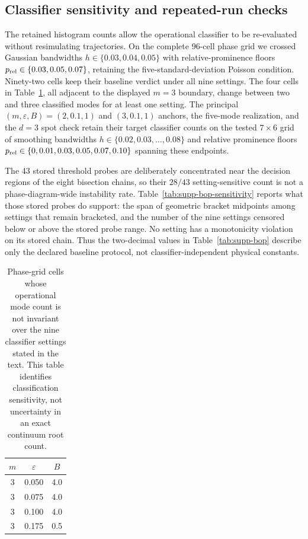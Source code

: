 \documentclass[aps,physrev,onecolumn,amsmath,amssymb,longbibliography]{revtex4-2}
\begin{document}
\subsection{Classifier sensitivity and repeated-run checks}
\label{sec:supp-classifier-sensitivity}

The retained histogram counts allow the operational classifier to be
re-evaluated without resimulating trajectories.  On the complete 96-cell
phase grid we crossed Gaussian bandwidths
\(h\in\{0.03,0.04,0.05\}\) with relative-prominence floors
\(p_{\rm rel}\in\{0.03,0.05,0.07\}\), retaining the five-standard-deviation
Poisson condition.  Ninety-two cells keep their baseline verdict under all
nine settings.  The four cells in Table~\ref{tab:supp-sensitive-cells}, all
adjacent to the displayed \(m=3\) boundary, change between two and three
classified modes for at least one setting.  The principal
\((m,\varepsilon,B)=(2,0.1,1)\) and \((3,0.1,1)\) anchors, the five-mode
realization, and the
\(d=3\) spot check retain their target classifier counts on the tested
\(7\times6\) grid of smoothing bandwidths
\(h\in\{0.02,0.03,\ldots,0.08\}\) and relative prominence floors
\(p_{\rm rel}\in\{0,0.01,0.03,0.05,0.07,0.10\}\) spanning these
endpoints.

The 43 stored threshold probes are deliberately concentrated near the
decision regions of the eight bisection chains, so their \(28/43\)
setting-sensitive count is
not a phase-diagram-wide instability rate.  Table~\ref{tab:supp-bop-sensitivity}
reports what those stored probes do support: the span of geometric bracket
midpoints among settings that remain bracketed, and the number of the nine
settings censored below or above the stored probe range.  No setting has a
monotonicity violation on its stored chain.  Thus the two-decimal values in
Table~\ref{tab:supp-bop} describe only the declared baseline protocol, not
classifier-independent physical constants.

\begin{table}[t]
\caption{Phase-grid cells whose operational mode count is not invariant
over the nine classifier settings stated in the text.  This table identifies
classification sensitivity, not uncertainty in an exact continuum root
count.
\label{tab:supp-sensitive-cells}}
\begin{ruledtabular}
\begin{tabular}{ccc}
\(m\) & \(\varepsilon\) & \(B\)\\
\hline
3 & 0.050 & 4.0\\
3 & 0.075 & 4.0\\
3 & 0.100 & 4.0\\
3 & 0.175 & 0.5\\
\end{tabular}
\end{ruledtabular}
\end{table}
\end{document}
